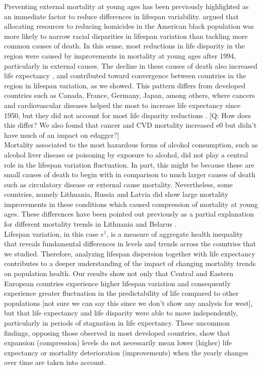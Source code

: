 \documentclass{article}
\begin{document}
\begin{spacing}{1.5}
Preventing external mortality at young ages has been previously highlighted as an immediate factor to reduce differences in lifespan variability. \citet{firebaugh2014lifespans} argued that allocating resources to reducing homicides in the American black population was more likely to narrow racial disparities in lifespan variation than tackling more common causes of death. In this sense, most reductions in life disparity in the region were caused by improvements in mortality at young ages after 1994, particularly in external causes. The decline in these causes of death also \textcolor[rgb]{1,0,0}{increased} life expectancy \citep{trias2017contribution}, and \textcolor[rgb]{1,0,0}{contributed toward} convergence between countries in the region in lifespan variation, as we showed. This pattern differs from developed countries such as Canada, France, Germany, Japan, among others, where cancers and cardiovascular diseases helped the most to increase life expectancy since 1950, but they did not account for most life disparity reductions \citep{seligman2016equity}. \textcolor[rgb]{0.92,0.5,0.4}{[Q: How does this differ? We also found that cancer and CVD mortality increased e0 but didn't have much of an impact on edagger?]}\\

Mortality associated to the most hazardous forms of alcohol consumption, such as alcohol liver disease or poisoning by exposure to alcohol, did not play a central role in the lifespan variation fluctuation. In part, this might be because these are small causes of death to begin with in comparison to much larger causes of death such as circulatory disease or external cause mortality. Nevertheless, some countries, namely Lithuania, Russia and Latvia did show large mortality improvements in these conditions which caused compression of mortality at young ages. These differences have been pointed out previously as a partial explanation for different mortality trends in Lithuania and Belarus \citep{grigoriev2015spatial}.\\

Lifespan variation, in this case $e^\dagger$, is a measure of aggregate health inequality that reveals fundamental differences in levels and trends across the countries that we studied. Therefore, analyzing lifespan dispersion together with life expectancy contributes to a deeper understanding of the impact of changing mortality trends on population health. Our results show not only that Central and Eastern European countries experience higher lifespan variation and \textcolor[rgb]{1,0,0}{consequently experience} greater fluctuation in the predictability of life compared to other populations \textcolor[rgb]{0.92,0.5,0.4}{[not sure we can say this since we don't show any analysis for west]}, but that life expectancy and life disparity were able to move independently, particularly in periods of stagnation in life expectancy. These uncommon findings, opposing those observed in most developed countries, show that expansion (compression) levels do not necessarily mean lower (higher) life expectancy  or mortality deterioration (improvements) when the yearly changes over time are taken into account. \\


\end{spacing}
\end{document}
